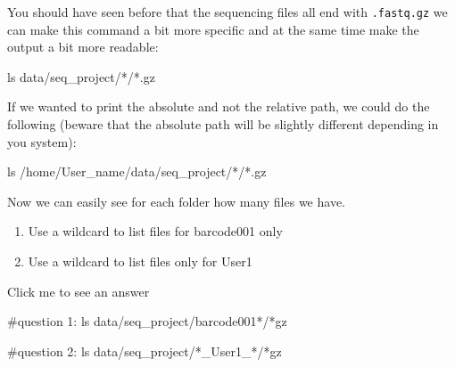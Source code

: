 \documentclass[
  letterpaper,
  DIV=11,
  numbers=noendperiod]{scrreprt}
\newenvironment{Shaded}{}{}
\newcommand{\CommentTok}[1]{\textcolor[rgb]{0.42,0.45,0.49}{#1}}
\newcommand{\FunctionTok}[1]{\textcolor[rgb]{0.44,0.26,0.76}{#1}}
\newcommand{\NormalTok}[1]{\textcolor[rgb]{0.14,0.16,0.18}{#1}}
\newcommand{\PreprocessorTok}[1]{\textcolor[rgb]{0.84,0.23,0.29}{#1}}
\providecommand{\tightlist}{%
  \setlength{\itemsep}{0pt}\setlength{\parskip}{0pt}}\usepackage{longtable,booktabs,array}
\begin{document}
You should have seen before that the sequencing files all end with
\texttt{.fastq.gz} we can make this command a bit more specific and at
the same time make the output a bit more readable:

\begin{Shaded}
\begin{Highlighting}[]
\FunctionTok{ls}\NormalTok{ data/seq\_project/}\PreprocessorTok{*}\NormalTok{/}\PreprocessorTok{*}\NormalTok{.gz}
\end{Highlighting}
\end{Shaded}

If we wanted to print the absolute and not the relative path, we could
do the following (beware that the absolute path will be slightly
different depending in you system):

\begin{Shaded}
\begin{Highlighting}[]
\FunctionTok{ls}\NormalTok{ /home/User\_name/data/seq\_project/}\PreprocessorTok{*}\NormalTok{/}\PreprocessorTok{*}\NormalTok{.gz}
\end{Highlighting}
\end{Shaded}

Now we can easily see for each folder how many files we have.

\begin{tcolorbox}[enhanced jigsaw, colframe=quarto-callout-caution-color-frame, colbacktitle=quarto-callout-caution-color!10!white, opacitybacktitle=0.6, breakable, titlerule=0mm, colback=white, toptitle=1mm, leftrule=.75mm, opacityback=0, coltitle=black, left=2mm, toprule=.15mm, bottomtitle=1mm, rightrule=.15mm, title=\textcolor{quarto-callout-caution-color}{\faFire}\hspace{0.5em}{Exercise}, bottomrule=.15mm, arc=.35mm]

\begin{enumerate}
\def\labelenumi{\arabic{enumi}.}
\tightlist
\item
  Use a wildcard to list files for barcode001 only
\item
  Use a wildcard to list files only for User1
\end{enumerate}

Click me to see an answer

\begin{Shaded}
\begin{Highlighting}[]
\CommentTok{\#question 1:}
\FunctionTok{ls}\NormalTok{ data/seq\_project/barcode001}\PreprocessorTok{*}\NormalTok{/}\PreprocessorTok{*}\NormalTok{gz}

\CommentTok{\#question 2:}
\FunctionTok{ls}\NormalTok{ data/seq\_project/}\PreprocessorTok{*}\NormalTok{\_User1\_}\PreprocessorTok{*}\NormalTok{/}\PreprocessorTok{*}\NormalTok{gz}
\end{Highlighting}
\end{Shaded}

\end{tcolorbox}
\end{document}
